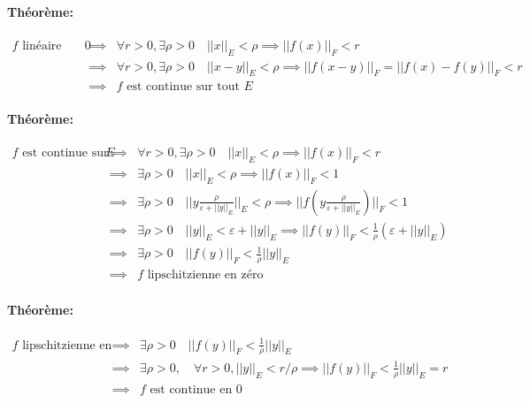 \documentclass[a4paper, 11pt, french]{book}
\theoremstyle{plain} %
\theoremstyle{definition} %
\theoremstyle{remark} %
\newcommand{\1}{\mathds{1}}
\begin{document}
{\paragraph{Théorème:}
$
	\begin{array}{rcl}
		\text{$f$ linéaire entre evn continue en $0$}
		  & \implies & \forall r > 0, \exists\rho > 0\quad ||x||_E <\rho\implies ||f(x)||_F < r                     \\
		  & \implies & \forall r > 0, \exists\rho > 0\quad ||x-y||_E <\rho\implies ||f(x-y)||_F=||f(x)-f(y)||_F < r \\
		  & \implies & \text{$f$ est continue sur tout $E$}
	\end{array}
$

\paragraph{Théorème:}
$
	\begin{array}{rcl}
		\text{$f$ est continue sur tout $E$}
		  & \implies & \forall r > 0, \exists\rho > 0\quad ||x||_E <\rho\implies ||f(x)||_F < r                                                      \\
		  & \implies & \exists\rho > 0\quad ||x||_E <\rho\implies ||f(x)||_F < 1                                                                     \\
		  & \implies & \exists\rho > 0\quad ||y\frac{\rho}{\varepsilon + ||y||_E}||_E <\rho\implies ||f(y\frac{\rho}{\varepsilon + ||y||_E})||_F < 1 \\
		  & \implies & \exists\rho > 0\quad ||y||_E <\varepsilon + ||y||_E\implies ||f(y)||_F <\frac{1}{\rho}(\varepsilon + ||y||_E)                 \\
		  & \implies & \exists\rho > 0\quad ||f(y)||_F <\frac{1}{\rho}||y||_E                                                                        \\
		  & \implies & \text{$f$ lipschitzienne en zéro}
	\end{array}
$

\paragraph{Théorème:}
$
	\begin{array}{rcl}
		\text{$f$ lipschitzienne en zéro}
		  & \implies & \exists\rho > 0\quad ||f(y)||_F <\frac{1}{\rho}||y||_E                                            \\
		  & \implies & \exists\rho > 0, \quad\forall r > 0, ||y||_E < r/\rho\implies ||f(y)||_F <\frac{1}{\rho}||y||_E=r \\
		  & \implies & \text{$f$ est continue en $0$}
	\end{array}
$

}
\end{document}
